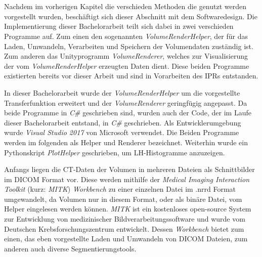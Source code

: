 \chapter{}
\label{sec:concept}


Nachdem im vorherigen Kapitel die verschieden Methoden die genutzt werden vorgestellt wurden, beschäftigt sich dieser Abschnitt mit dem Softwaredesign.
\newline
Die Implementierung dieser Bachelorarbeit teilt sich dabei in zwei verschieden Programme auf. Zum einen den sogenannten \textit{VolumeRenderHelper}, der für das Laden, Umwandeln, Verarbeiten und Speichern der Volumendaten zuständig ist.
Zum anderen das Unityprogramm \textit{VolumeRenderer}, welches zur Visualisierung der vom \textit{VolumeRenderHelper} erzeugten Daten dient. Diese beiden Programme existierten bereits vor dieser Arbeit und sind in Vorarbeiten des IPRs entstanden.


In dieser Bachelorarbeit wurde der \textit{VolumeRenderHelper} um die vorgestellte Transferfunktion erweitert und der \textit{VolumeRenderer} geringfügig angepasst. Da beide Programme in \textit{C\#} geschrieben sind, wurden auch der Code, der im Laufe dieser Bachelorarbeit entstand, in \textit{C\#} geschrieben. Als Entwicklerumgebung wurde \textit{Visual Studio 2017} von Microsoft verwendet.
\newline
Die Beiden Programme werden im folgenden als Helper und Renderer bezeichnet. Weiterhin wurde ein Pythonskript \textit{PlotHelper} geschrieben, um LH-Histogramme anzuzeigen.


Anfangs liegen die CT-Daten der Volumen in mehreren Dateien als Schnittbilder im DICOM Format vor. Diese werden mithilfe der \textit{Medical Imaging Interaction Toolkit} (kurz: \textit{MITK}) \textit{Workbench} \cite{mitk} zu einer einzelnen Datei im .nrrd Format umgewandelt, da Volumen nur in diesem Format, oder als binäre Datei, vom Helper eingelesen werden können.
\textit{MITK} ist ein kostenloses open-source System zur Entwicklung von medizinischer Bildverarbeitungssoftware und wurde vom Deutschen Krebsforschungszentrum entwickelt. Dessen \textit{Workbench} bietet zum einen, das eben vorgestellte Laden und Umwandeln von DICOM Dateien, zum anderen auch diverse Segmentierungstools.



